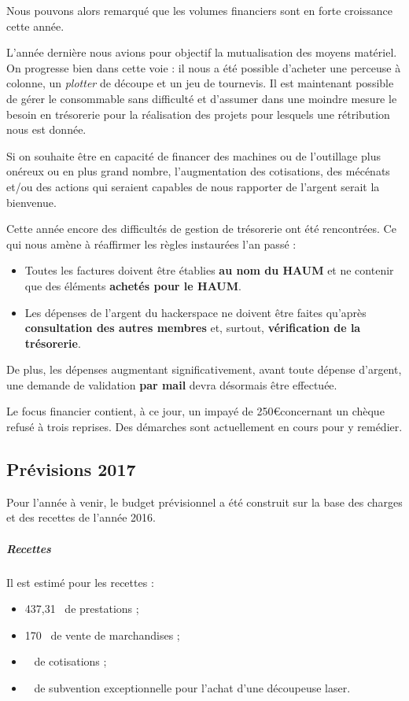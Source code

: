\documentclass[11pt]{article}
\begin{document}
Nous pouvons alors remarqué que les volumes financiers sont en forte croissance 
cette année.

L'année dernière nous avions pour objectif la mutualisation des moyens matériel. 
On progresse bien dans cette voie : il nous a été possible d'acheter une perceuse à 
colonne, un \textit{plotter} de découpe et un jeu de tournevis.
Il est maintenant possible de gérer le consommable sans difficulté et d'assumer dans
une moindre mesure le besoin en trésorerie pour la réalisation des projets pour lesquels 
une rétribution nous est donnée.

Si on souhaite être en capacité de financer des machines ou de l'outillage plus onéreux 
ou en plus grand nombre, l'augmentation des cotisations, des mécénats et/ou des 
actions qui seraient capables de nous rapporter de l'argent serait la bienvenue.

\bigskip

Cette année encore des difficultés de gestion de trésorerie ont été rencontrées. Ce qui 
nous amène à réaffirmer les règles instaurées l'an passé : 
\begin{itemize}
 \item Toutes les factures doivent être établies \textbf{au nom du HAUM} et ne 
 contenir que des éléments \textbf{achetés pour le HAUM}. 
 \item Les dépenses de l'argent du hackerspace ne doivent être faites qu'après 
 \textbf{consultation des autres membres} et, surtout, \textbf{vérification de la 
 trésorerie}.
\end{itemize}
De plus, les dépenses augmentant significativement, avant toute dépense d'argent, une 
demande de validation \textbf{par mail} devra désormais être effectuée.

Le focus financier contient, à ce jour, un impayé de 250\euro concernant un chèque refusé 
à trois reprises. Des démarches sont actuellement en cours pour y remédier.

\subsection{Prévisions 2017}

Pour l'année à venir, le budget prévisionnel a été construit sur la base des charges 
et des recettes de l'année 2016.

\subparagraph{Recettes}
Il est estimé pour les recettes :
\begin{itemize}
 \item 437,31~\officialeuro{} de prestations ;
 \item 170~\officialeuro{} de vente de marchandises ;
 \item {}~\officialeuro{} de cotisations ;
 \item {}~\officialeuro{} de subvention exceptionnelle pour l'achat d'une découpeuse laser.
\end{itemize}
\end{document}
